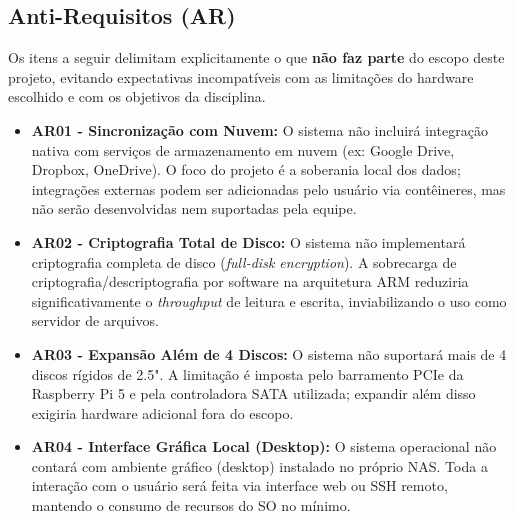 \documentclass[a4paper,12pt]{article}
\begin{document}
\subsection{Anti-Requisitos (AR)}
Os itens a seguir delimitam explicitamente o que \textbf{não faz parte} do escopo deste projeto, evitando expectativas incompatíveis com as limitações do hardware escolhido e com os objetivos da disciplina.
\begin{itemize}
    \item \textbf{AR01 - Sincronização com Nuvem:} O sistema não incluirá integração nativa com serviços de armazenamento em nuvem (ex: Google Drive, Dropbox, OneDrive). O foco do projeto é a soberania local dos dados; integrações externas podem ser adicionadas pelo usuário via contêineres, mas não serão desenvolvidas nem suportadas pela equipe.
    \item \textbf{AR02 - Criptografia Total de Disco:} O sistema não implementará criptografia completa de disco (\textit{full-disk encryption}). A sobrecarga de criptografia/descriptografia por software na arquitetura ARM reduziria significativamente o \textit{throughput} de leitura e escrita, inviabilizando o uso como servidor de arquivos.
    \item \textbf{AR03 - Expansão Além de 4 Discos:} O sistema não suportará mais de 4 discos rígidos de 2.5". A limitação é imposta pelo barramento PCIe da Raspberry Pi 5 e pela controladora SATA utilizada; expandir além disso exigiria hardware adicional fora do escopo.
    \item \textbf{AR04 - Interface Gráfica Local (Desktop):} O sistema operacional não contará com ambiente gráfico (desktop) instalado no próprio NAS. Toda a interação com o usuário será feita via interface web ou SSH remoto, mantendo o consumo de recursos do SO no mínimo.
\end{itemize}


\end{document}
